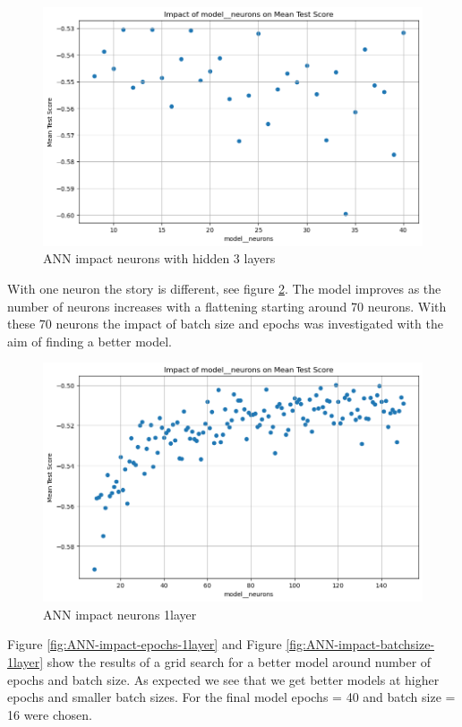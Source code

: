 \documentclass{article}
\begin{document}
\begin{figure}
	\centering
	\includegraphics[width=\linewidth]{figures/ANN_impact_neurons_3layers.png}
	\caption{ANN impact neurons with hidden 3 layers}
	\label{fig:ANN-impact-neurons-3layers}
\end{figure}

With one neuron the story is different, see figure \ref{fig:ANN-impact-neurons-1layer}. The model improves as the number of neurons increases with a flattening starting around 70 neurons. With these 70 neurons the impact of batch size and epochs was investigated with the aim of finding a better model.

\begin{figure}
	\centering
	\includegraphics[width=\linewidth]{figures/ANN_impact_neurons_1layer.png}
	\caption{ANN impact neurons 1layer}
	\label{fig:ANN-impact-neurons-1layer}
\end{figure}

Figure \ref{fig:ANN-impact-epochs-1layer} and Figure \ref{fig:ANN-impact-batchsize-1layer} show the results of a grid search for a better model around number of epochs and batch size.
As expected we see that we get better models at higher epochs and smaller batch sizes. For the final model epochs = 40 and batch size = 16 were chosen.
\end{document}
